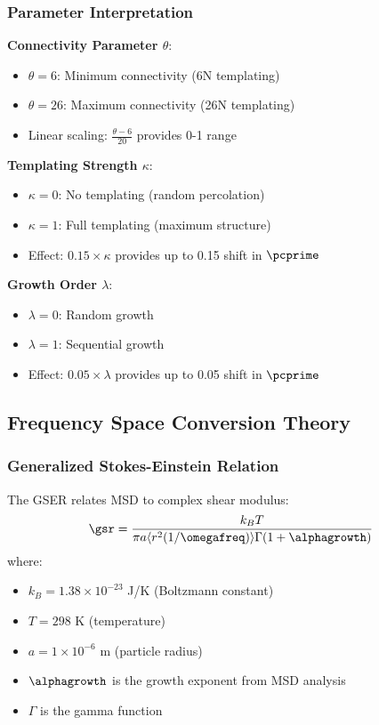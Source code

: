 \subsubsection{Parameter Interpretation}
\textbf{Connectivity Parameter $\theta$}:
\begin{itemize}
    \item $\theta = 6$: Minimum connectivity (6N templating)
    \item $\theta = 26$: Maximum connectivity (26N templating)
    \item Linear scaling: $\frac{\theta-6}{20}$ provides 0-1 range
\end{itemize}

\textbf{Templating Strength $\kappa$}:
\begin{itemize}
    \item $\kappa = 0$: No templating (random percolation)
    \item $\kappa = 1$: Full templating (maximum structure)
    \item Effect: $0.15 \times \kappa$ provides up to 0.15 shift in $\pcprime$
\end{itemize}

\textbf{Growth Order $\lambda$}:
\begin{itemize}
    \item $\lambda = 0$: Random growth
    \item $\lambda = 1$: Sequential growth
    \item Effect: $0.05 \times \lambda$ provides up to 0.05 shift in $\pcprime$
\end{itemize}

\subsection{Frequency Space Conversion Theory}

\subsubsection{Generalized Stokes-Einstein Relation}
The GSER relates MSD to complex shear modulus:
\begin{equation}
\gsr = \frac{k_B T}{\pi a \langle r^2(1/\omegafreq) \rangle \Gamma(1 + \alphagrowth)}
\end{equation}
where:
\begin{itemize}
    \item $k_B = 1.38 \times 10^{-23}$ J/K (Boltzmann constant)
    \item $T = 298$ K (temperature)
    \item $a = 1 \times 10^{-6}$ m (particle radius)
    \item $\alphagrowth$ is the growth exponent from MSD analysis
    \item $\Gamma$ is the gamma function
\end{itemize}


